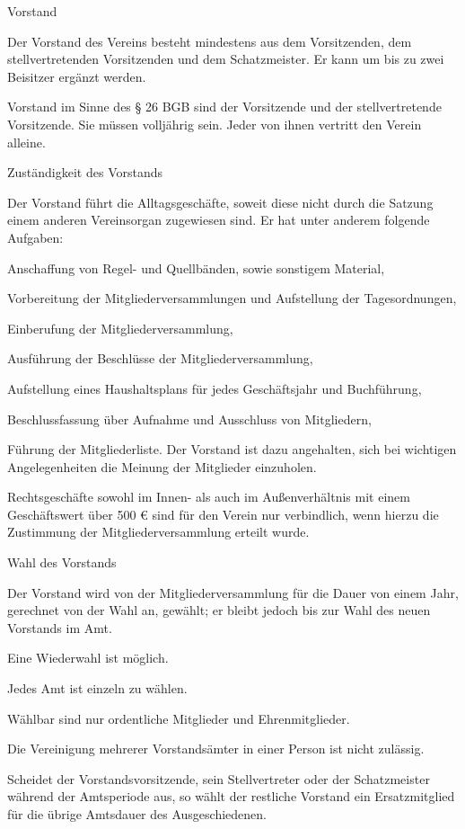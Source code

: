 \documentclass[11pt,a4paper,twoside,openany,article]{memoir}
\begin{document}
\begin{para}{Vorstand}
	\label{p:vs}
	\item Der Vorstand des Vereins besteht mindestens aus dem Vorsitzenden, dem stellvertretenden Vorsitzenden und dem Schatzmeister.
	Er kann um bis zu zwei Beisitzer ergänzt werden.
	\item Vorstand im Sinne des § 26 BGB sind der Vorsitzende und der stellvertretende Vorsitzende. Sie müssen volljährig sein. Jeder von ihnen vertritt den Verein alleine.
\end{para}

\begin{para}{Zuständigkeit des Vorstands}
	\label{p:vszuständigkeit}
	\item Der Vorstand führt die Alltagsgeschäfte, soweit diese nicht durch die Satzung einem anderen Vereinsorgan zugewiesen sind. Er hat unter anderem folgende Aufgaben:
	\begin{subpara}
		\item Anschaffung von Regel- und Quellbänden, sowie sonstigem Material,
		\item Vorbereitung der Mitgliederversammlungen und Aufstellung der Tagesordnungen,
		\item Einberufung der Mitgliederversammlung,
		\item Ausführung der Beschlüsse der Mitgliederversammlung,
		\item Aufstellung eines Haushaltsplans für jedes Geschäftsjahr und Buchführung,
		\item Beschlussfassung über Aufnahme und Ausschluss von Mitgliedern,
		\item Führung der Mitgliederliste.
		Der Vorstand ist dazu angehalten, sich bei wichtigen Angelegenheiten die Meinung der Mitglieder einzuholen.
	\end{subpara}
	\item Rechtsgeschäfte sowohl im Innen- als auch im Außenverhältnis mit einem Geschäftswert über 500 € sind für den Verein nur verbindlich, wenn hierzu die Zustimmung der Mitgliederversammlung erteilt wurde.
\end{para}

\begin{para}{Wahl des Vorstands}
	\label{p:vswahl}
	\item Der Vorstand wird von der Mitgliederversammlung für die Dauer von einem Jahr, gerechnet von der Wahl an, gewählt; er bleibt jedoch bis zur Wahl des neuen Vorstands im Amt.
	\item Eine Wiederwahl ist möglich.
	\item Jedes Amt ist einzeln zu wählen.
	\item Wählbar sind nur ordentliche Mitglieder und Ehrenmitglieder.
	\item Die Vereinigung mehrerer Vorstandsämter in einer Person ist nicht zulässig.
	\item Scheidet der Vorstandsvorsitzende, sein Stellvertreter oder der Schatzmeister während der Amtsperiode aus, so wählt der restliche Vorstand ein Ersatzmitglied für die übrige Amtsdauer des Ausgeschiedenen.
\end{para}
\end{document}

